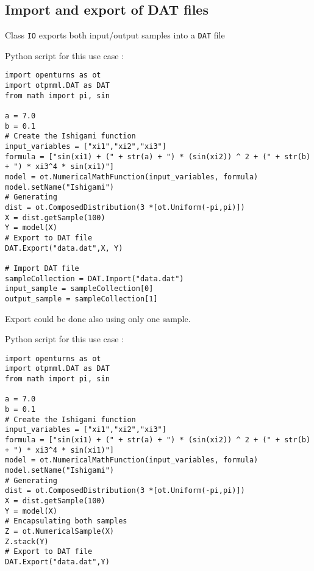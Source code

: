 \subsection{Import and export of DAT files}

Class \texttt{IO} exports both input\slash output samples into a \texttt{DAT} file


Python script for this use case :

\begin{lstlisting}
import openturns as ot
import otpmml.DAT as DAT
from math import pi, sin

a = 7.0
b = 0.1
# Create the Ishigami function
input_variables = ["xi1","xi2","xi3"]
formula = ["sin(xi1) + (" + str(a) + ") * (sin(xi2)) ^ 2 + (" + str(b) + ") * xi3^4 * sin(xi1)"]
model = ot.NumericalMathFunction(input_variables, formula)
model.setName("Ishigami")
# Generating
dist = ot.ComposedDistribution(3 *[ot.Uniform(-pi,pi)])
X = dist.getSample(100)
Y = model(X)
# Export to DAT file
DAT.Export("data.dat",X, Y)

# Import DAT file
sampleCollection = DAT.Import("data.dat")
input_sample = sampleCollection[0]
output_sample = sampleCollection[1]
\end{lstlisting}

Export could be done also using only one sample.


Python script for this use case :

\begin{lstlisting}
import openturns as ot
import otpmml.DAT as DAT
from math import pi, sin

a = 7.0
b = 0.1
# Create the Ishigami function
input_variables = ["xi1","xi2","xi3"]
formula = ["sin(xi1) + (" + str(a) + ") * (sin(xi2)) ^ 2 + (" + str(b) + ") * xi3^4 * sin(xi1)"]
model = ot.NumericalMathFunction(input_variables, formula)
model.setName("Ishigami")
# Generating
dist = ot.ComposedDistribution(3 *[ot.Uniform(-pi,pi)])
X = dist.getSample(100)
Y = model(X)
# Encapsulating both samples
Z = ot.NumericalSample(X)
Z.stack(Y)
# Export to DAT file
DAT.Export("data.dat",Y)
\end{lstlisting}
